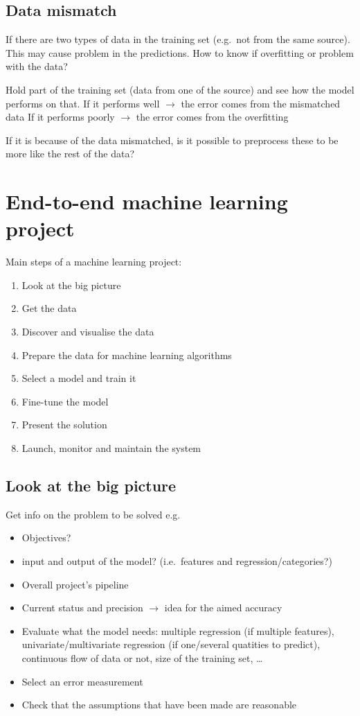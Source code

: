\documentclass{article}
\begin{document}
\subsection{Data mismatch}
If there are two types of data in the training set (e.g.\ not from the same source).
This may cause problem in the predictions.
How to know if overfitting or problem with the data?

Hold part of the training set (data from one of the source) and see how the model performs on that.
If it performs well $\rightarrow$ the error comes from the mismatched data
If it performs poorly $\rightarrow$ the error comes from the overfitting

If it is because of the data mismatched, is it possible to preprocess these to be more like the rest of the data?



\newpage
\section{End-to-end machine learning project}

Main steps of a machine learning project:
\begin{enumerate}
    \item Look at the big picture
    \item Get the data
    \item Discover and visualise the data
    \item Prepare the data for machine learning algorithms
    \item Select a model and train it
    \item Fine-tune the model
    \item Present the solution
    \item Launch, monitor and maintain the system
\end{enumerate}

\subsection{Look at the big picture}
Get info on the problem to be solved e.g.\
\begin{itemize}
    \item Objectives?
    \item input and output of the model? (i.e.\ features and regression/categories?)
    \item Overall project's pipeline
    \item Current status and precision $\rightarrow$ idea for the aimed accuracy
    \item Evaluate what the model needs: multiple regression (if multiple features), univariate/multivariate regression (if one/several quatities to predict), continuous flow of data or not, size of the training set, \ldots
    \item Select an error measurement
    \item Check that the assumptions that have been made are reasonable
\end{itemize}
\end{document}
